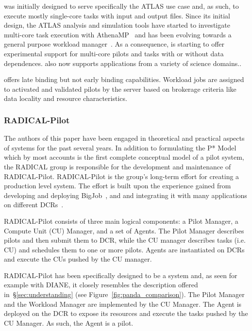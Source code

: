 \documentclass{sig-alternate}
\begin{document}
\panda was initially designed to serve specifically the ATLAS use case and, as
such, to execute mostly single-core tasks with input and output files. Since its
initial design, the ATLAS analysis and simulation tools have started to
investigate multi-core task execution with AthenaMP~\cite{crooks2012multi} and
\panda has been evolving towards a general purpose workload
manager~\cite{maeno2014evolution}. As a consequence, \panda is starting to offer
experimental support for multi-core pilots and tasks with or without data
dependences. \panda also now supports applications from a variety of science
domains.\cite{x,y}.

\panda offers late binding but not early binding capabilities. Workload jobs are
assigned to activated and validated pilots by the \panda server based on
brokerage criteria like data locality and resource characteristics.

%
\subsubsection{RADICAL-Pilot}
\label{sec:radical_pilot}

The authors of this paper have been engaged in theoretical and practical aspects
of \pilot systems for the past several years. In addition to formulating the P*
Model~\cite{luckow2012} which by most accounts is the first complete conceptual
model of a pilot system, the RADICAL group is responsible for the development
and maintenance of RADICAL-Pilot\cite{merzky2015radical,rp_url}. RADICAL-Pilot
is the group's long-term effort for creating a production level \pilot system.
The effort is built upon the experience gained from developing and deploying
BigJob~\cite{luckow2010}, and and integrating it with many applications on
different DCRs~\cite{x,y,z}.

RADICAL-Pilot consists of three main logical components: a Pilot Manager, a
Compute Unit (CU) Manager, and a set of Agents. The Pilot Manager describes
pilots and then submit them to DCR, while the CU manager describes tasks (i.e.
CU) and schedules them to one or more pilots. Agents are instantiated on DCRs
and execute the CUs pushed by the CU manager.

RADICAL-Pilot has been specifically designed to be a \pilot system and, as seen
for example with DIANE, it closely resembles the description offered
in~\S\ref{sec:understanding} (see Figure~\ref{fig:panda_comparison}). The Pilot
Manager and the Workload Manager are implemented by the CU Manager. The Agent is
deployed on the DCR to expose its resources and execute the tasks pushed by the
CU Manager. As such, the Agent is a pilot.
\end{document}
